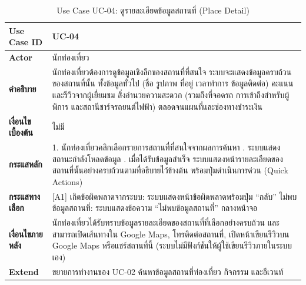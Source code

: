 \begin{table}[H]
\centering
\caption{Use Case UC-04: ดูรายละเอียดข้อมูลสถานที่ (Place Detail)}
\label{tab:uc04}
\begin{tabular}{|p{3.2cm}|p{10cm}|}
\hline
\textbf{Use Case ID} & UC-04 \\ \hline
\textbf{Actor} & นักท่องเที่ยว \\ \hline
\textbf{คำอธิบาย} & นักท่องเที่ยวต้องการดูข้อมูลเชิงลึกของสถานที่ที่สนใจ ระบบจะแสดงข้อมูลครบถ้วนของสถานที่นั้น ทั้งข้อมูลทั่วไป (ชื่อ รูปภาพ ที่อยู่ เวลาทำการ ข้อมูลติดต่อ) คะแนนและรีวิวจากผู้เยี่ยมชม สิ่งอำนวยความสะดวก (รวมถึงที่จอดรถ การเข้าถึงสำหรับผู้พิการ และสถานีชาร์จรถยนต์ไฟฟ้า) ตลอดจนแผนที่และช่องทางชำระเงิน \\ \hline
\textbf{เงื่อนไขเบื้องต้น} & ไม่มี \\ \hline
\textbf{กระแสหลัก} & 1. นักท่องเที่ยวคลิกเลือกรายการสถานที่ที่สนใจจากผลการค้นหา \newline 2. ระบบแสดงสถานะกำลังโหลดข้อมูล \newline 3. เมื่อได้รับข้อมูลสำเร็จ ระบบแสดงหน้ารายละเอียดของสถานที่นั้นอย่างครบถ้วนตามที่อธิบายไว้ข้างต้น พร้อมปุ่มดำเนินการด่วน (Quick Actions) \\ \hline
\textbf{กระแสทางเลือก} & [A1] เกิดข้อผิดพลาดจากระบบ: ระบบแสดงหน้าข้อผิดพลาดพร้อมปุ่ม ``กลับ'' \newline [A2] ไม่พบข้อมูลสถานที่: ระบบแสดงข้อความ ``ไม่พบข้อมูลสถานที่'' กลางหน้าจอ \\ \hline
\textbf{เงื่อนไขภายหลัง} & นักท่องเที่ยวได้รับทราบข้อมูลรายละเอียดของสถานที่ที่เลือกอย่างครบถ้วน และสามารถเปิดเส้นทางใน Google Maps, โทรติดต่อสถานที่, เปิดหน้าเขียนรีวิวบน Google Maps หรือแชร์สถานที่นี้ (ระบบไม่มีฟังก์ชันให้ผู้ใช้เขียนรีวิวภายในระบบเอง) \\ \hline
\textbf{Extend} & ขยายการทำงานของ UC-02 ค้นหาข้อมูลสถานที่ท่องเที่ยว กิจกรรม และอีเวนท์ \\
\hline
\end{tabular}
\end{table}

